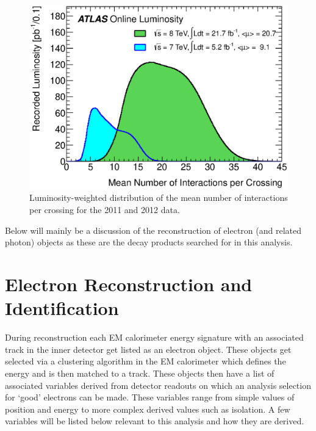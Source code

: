 \begin{figure}[h!]
	\centering
		\includegraphics[width=0.8\linewidth]{images/mu_2011_2012-dec.eps}
	\caption{Luminosity-weighted distribution of the mean number of interactions per crossing for the 2011 and 2012 data. \cite{mu_2011_2012_dec,Aad:2011dr}}
	\label{fig:pu}
\end{figure}


Below will mainly be a discussion of the reconstruction of electron (and related photon) objects as these are the decay products searched for in this analysis.



\section{Electron Reconstruction and Identification}
\label{sec:ReconElec}

	During reconstruction each EM calorimeter energy signature with an associated track in the inner detector get listed as an electron object. These objects get selected via a clustering algorithm in the EM calorimeter which defines the energy and is then matched to a track. These objects then have a list of associated variables derived from detector readouts on which an analysis selection for `good' electrons can be made. These variables range from simple values of position and energy to more complex derived values such as isolation. A few variables will be listed below relevant to this analysis and how they are derived.

